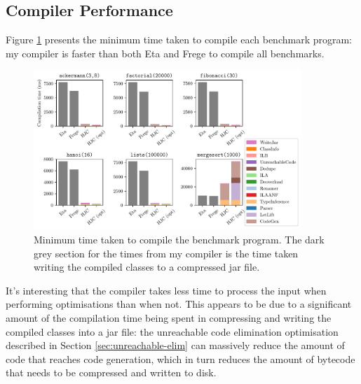 \documentclass[dissertation.tex]{subfiles}
\begin{document}
{{        %


    }
    \subsection{Compiler Performance}
    {

        Figure \ref{fig:compiler-perf} presents the minimum time taken to compile each benchmark program: my compiler is
        faster than both Eta and Frege to compile all benchmarks.
        
        \begin{figure}[h]
            \centering
            \captionsetup{width=0.8\textwidth}
            \includegraphics[width=0.9\textwidth]{graphs/compiler_perf.pdf}
            \caption{Minimum time taken to compile the benchmark program. The dark grey section for the times from my compiler is the time taken writing the compiled classes to a compressed jar file.}
            \label{fig:compiler-perf}
        \end{figure}
        
        It's interesting that the compiler takes less time to process the input when performing optimisations than when
        not. This appears to be due to a significant amount of the compilation time being spent in compressing and
        writing the compiled classes into a jar file: the unreachable code elimination optimisation described in Section
        \ref{sec:unreachable-elim} can massively reduce the amount of code that reaches code generation, which in turn
        reduces the amount of bytecode that needs to be compressed and written to disk.

}}
\end{document}
